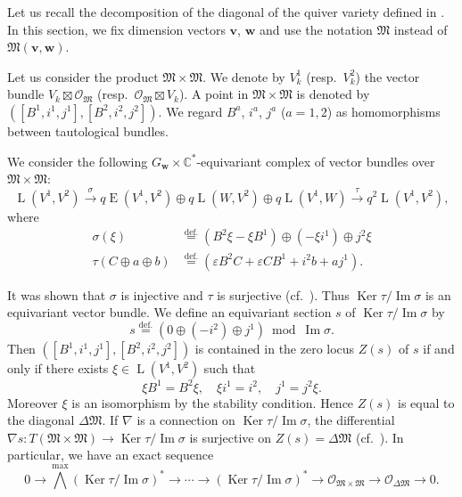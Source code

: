 \documentclass[12pt]{amsart}
\def\Bbb{\mathbb}
\def\frak{\mathfrak}
\theoremstyle{definition}
\theoremstyle{remark}
\numberwithin{equation}{subsection}
\newcommand{\defeq}{\overset{\operatorname{\scriptstyle def.}}{=}}
\newcommand{\C}{{\Bbb C}}
\newcommand{\Ker}{\operatorname{Ker}}
\newcommand{\Ima}{\operatorname{Im}}
\newcommand{\M}{{\frak M}} %
\newcommand{\bv}{{\mathbf v}} %
\newcommand{\bw}{{\mathbf w}} %
\newcommand{\HomE}{\operatorname{E}}
\newcommand{\HomL}{\operatorname{L}}
\newcommand{\shfO}{\mathcal O}
\newcommand{\Wedge}{{\textstyle \bigwedge}}
\begin{document}
Let us recall the decomposition of the diagonal of the quiver variety
defined in \cite[Sect.~6]{Na-alg}.
In this section, we fix dimension vectors $\bv$, $\bw$ and use the
notation $\M$ instead of $\M(\bv,\bw)$.

Let us consider the product $\M\times\M$. We denote by
$V^1_k$ (resp.\ $V^2_k$) the vector bundle $V_k\boxtimes\shfO_\M$
(resp.\ $\shfO_\M\boxtimes V_k$). A point in $\M\times\M$ is denoted by
$([B^1,i^1,j^1], [B^2, i^2, j^2])$. We regard $B^a$, $i^a$, $j^a$
($a=1,2$) as homomorphisms between tautological bundles.

We consider the following 
$G_\bw\times\C^*$-equivariant complex of vector bundles over $\M\times\M$:
\begin{equation}
  \HomL(V^1, V^2)
  \overset{\sigma}{\longrightarrow}
  q\HomE(V^1,V^2) \oplus 
    q\HomL(W, V^2) \oplus q\HomL(V^1,W)
  \overset{\tau}{\longrightarrow}
    q^2\HomL(V^1, V^2),
\label{eq:diagcpx}\end{equation}
where
\begin{align*}
        \sigma(\xi) & \defeq (B^2 \xi - \xi B^1) \oplus
         (-\xi i^1) \oplus j^2 \xi \\
        \tau(C\oplus a\oplus b)
         &\defeq ( \varepsilon B^2 C + \varepsilon C B^1 + i^2 b + a j^1).
\end{align*}

It was shown that $\sigma$ is injective and $\tau$ is surjective (cf.\ 
\cite[5.2]{Na-alg}). Thus $\Ker\tau/\Ima\sigma$ is an
equivariant vector bundle. We define an equivariant section $s$ of
$\Ker\tau/\Ima\sigma$ by
\begin{equation*}
  s \defeq \left( 0 \oplus (-i^2) \oplus j^1 \right) \bmod{\Ima \sigma}.
\end{equation*}
Then $([B^1,i^1,j^1], [B^2,i^2,j^2])$ is contained in the zero locus
$Z(s)$ of $s$ if and only if there exists $\xi\in \HomL(V^1, V^2)$ such
that
\begin{equation*}
        \xi B^1 = B^2 \xi, \quad
        \xi i^1 = i^2, \quad
        j^1 = j^2 \xi.
\end{equation*}
Moreover $\xi$ is an isomorphism by the stability condition. Hence
$Z(s)$ is equal to the diagonal $\Delta\M$.
If $\nabla$ is a connection on $\Ker\tau/\Ima\sigma$, the differential 
$\nabla s\colon T(\M\times\M)\to \Ker\tau/\Ima\sigma$ is surjective on 
$Z(s)=\Delta\M$ (cf.\ \cite[5.7]{Na-alg}).
In particular, we have an exact sequence
\begin{equation*}
   0 \to \Wedge^{\max} (\Ker\tau/\Ima\sigma)^* \to \cdots
   \to (\Ker\tau/\Ima\sigma)^* \to \shfO_{\M\times\M} \to
   \shfO_{\Delta \M} \to 0.
\end{equation*}
\end{document}
